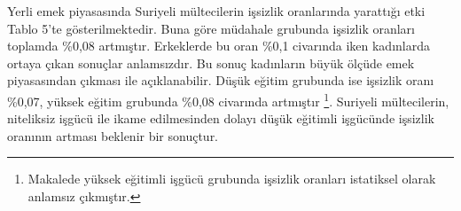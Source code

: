 \documentclass{article}
\begin{document}
\begin{justify}
\begin{table}[h]
\begin{tabular}{|ccccccc|}
                \end{tabular}
        \end{table}
        \FloatBarrier

        \newpage

        Yerli emek piyasasında Suriyeli mültecilerin işsizlik oranlarında yarattığı etki Tablo 5'te
        gösterilmektedir. Buna göre müdahale grubunda işsizlik oranları toplamda \%0,08 artmıştır.
        Erkeklerde bu oran \%0,1 civarında iken kadınlarda ortaya çıkan sonuçlar anlamsızdır. Bu sonuç kadınların
        büyük ölçüde emek piyasasından çıkması ile açıklanabilir. Düşük eğitim grubunda ise işsizlik 
        oranı \%0,07, yüksek eğitim grubunda \%0,08 civarında artmıştır
        \footnote{Makalede yüksek eğitimli işgücü grubunda işsizlik oranları istatiksel olarak anlamsız çıkmıştır.}. 
        Suriyeli mültecilerin, niteliksiz işgücü ile ikame edilmesinden dolayı düşük eğitimli işgücünde işsizlik oranının 
        artması beklenir bir sonuçtur.


\end{justify}
\end{document}
